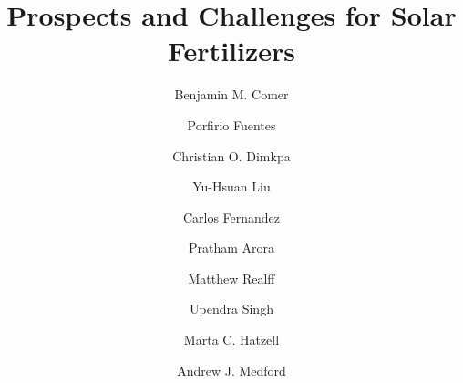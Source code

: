 \documentclass[final,1p,times,twocolumn]{elsarticle}
\begin{document}
\begin{frontmatter}


\title{Prospects and Challenges for Solar Fertilizers}




\author[GTChBE]{Benjamin M. Comer}
\author[IFDC]{Porfirio Fuentes}
\author[IFDC]{Christian O. Dimkpa}
\author[GTEE]{Yu-Hsuan Liu}
\author[GTME]{Carlos Fernandez}
\author[GTChBE]{Pratham Arora}
\author[GTChBE]{Matthew Realff}
\author[IFDC]{Upendra Singh}
\author[GTME]{Marta C. Hatzell}
\author[GTChBE]{Andrew J. Medford}

\address[GTChBE]{School of Chemical \& Biomolecular Engineering, Georgia Institute of Technology, Atlanta, GA 30318}

\address[GTME]{School of Mechanical Engineering, Georgia Institute of Technology, Atlanta, GA 30318}

\address[GTEE]{School of Environmental Engineering, Georgia Institute of Technology, Atlanta, GA 30318}

\address[IFDC]{International Fertilizer Development Center, Muscle Shoals, AL 35661}


\begin{abstract}


\end{abstract}
\end{frontmatter}
\end{document}

